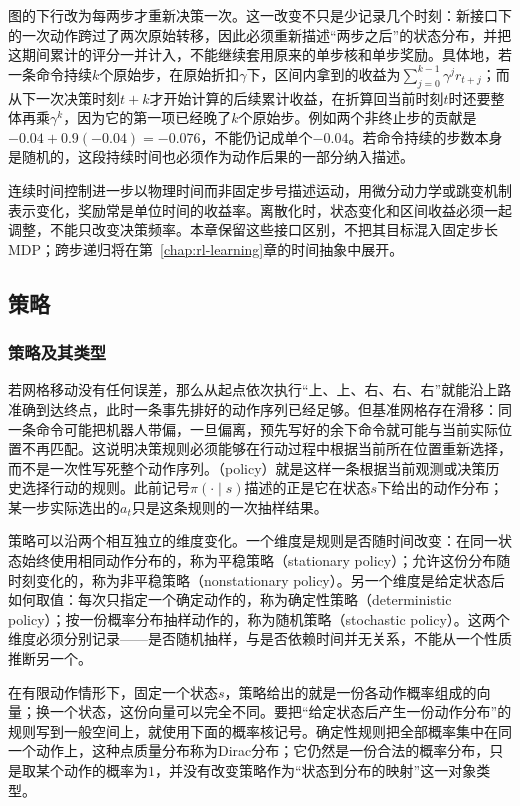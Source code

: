 图的下行改为每两步才重新决策一次。这一改变不只是少记录几个时刻：新接口下的一次动作跨过了两次原始转移，因此必须重新描述“两步之后”的状态分布，并把这期间累计的评分一并计入，不能继续套用原来的单步核和单步奖励。具体地，若一条命令持续$k$个原始步，在原始折扣$\gamma$下，区间内拿到的收益为$\sum_{j=0}^{k-1}\gamma^j r_{t+j}$；而从下一次决策时刻$t+k$才开始计算的后续累计收益，在折算回当前时刻$t$时还要整体再乘$\gamma^k$，因为它的第一项已经晚了$k$个原始步。例如两个非终止步的贡献是$-0.04+0.9(-0.04)=-0.076$，不能仍记成单个$-0.04$。若命令持续的步数本身是随机的，这段持续时间也必须作为动作后果的一部分纳入描述。

连续时间控制进一步以物理时间而非固定步号描述运动，用微分动力学或跳变机制表示变化，奖励常是单位时间的收益率。离散化时，状态变化和区间收益必须一起调整，不能只改变决策频率。本章保留这些接口区别，不把其目标混入固定步长MDP；跨步递归将在第~\ref{chap:rl-learning}章的时间抽象中展开。

\subsection{策略}
\label{sec:rl-overview-policies}

\subsubsection{策略及其类型}
\label{sec:rl-overview-policy-types}

若网格移动没有任何误差，那么从起点依次执行“上、上、右、右、右”就能沿上路准确到达终点，此时一条事先排好的动作序列已经足够。但基准网格存在滑移：同一条命令可能把机器人带偏，一旦偏离，预先写好的余下命令就可能与当前实际位置不再匹配。这说明决策规则必须能够在行动过程中根据当前所在位置重新选择，而不是一次性写死整个动作序列。（policy）就是这样一条根据当前观测或决策历史选择行动的规则。此前记号$\pi(\cdot\mid s)$描述的正是它在状态$s$下给出的动作分布；某一步实际选出的$a_t$只是这条规则的一次抽样结果。

策略可以沿两个相互独立的维度变化。一个维度是规则是否随时间改变：在同一状态始终使用相同动作分布的，称为平稳策略（stationary policy）；允许这份分布随时刻变化的，称为非平稳策略（nonstationary policy）。另一个维度是给定状态后如何取值：每次只指定一个确定动作的，称为确定性策略（deterministic policy）；按一份概率分布抽样动作的，称为随机策略（stochastic policy）。这两个维度必须分别记录——是否随机抽样，与是否依赖时间并无关系，不能从一个性质推断另一个。

在有限动作情形下，固定一个状态$s$，策略给出的就是一份各动作概率组成的向量；换一个状态，这份向量可以完全不同。要把“给定状态后产生一份动作分布”的规则写到一般空间上，就使用下面的概率核记号。确定性规则把全部概率集中在同一个动作上，这种点质量分布称为Dirac分布；它仍然是一份合法的概率分布，只是取某个动作的概率为$1$，并没有改变策略作为“状态到分布的映射”这一对象类型。


